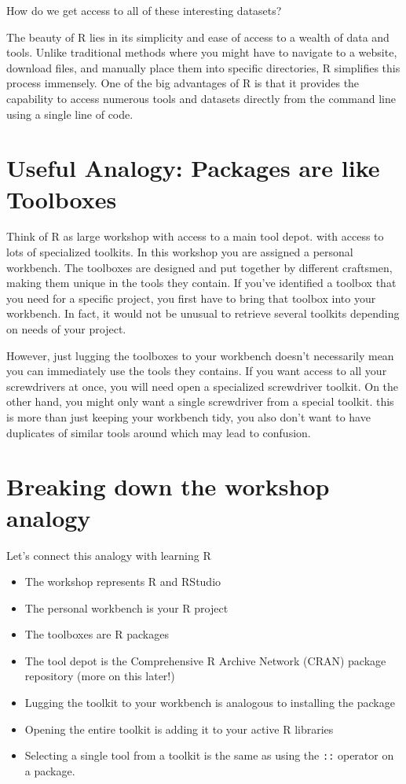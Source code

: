 \documentclass[
  letterpaper,
  DIV=11,
  numbers=noendperiod]{scrreprt}
\begin{document}
How do we get access to all of these interesting datasets?

The beauty of R lies in its simplicity and ease of access to a wealth of
data and tools. Unlike traditional methods where you might have to
navigate to a website, download files, and manually place them into
specific directories, R simplifies this process immensely. One of the
big advantages of R is that it provides the capability to access
numerous tools and datasets directly from the command line using a
single line of code.

\hypertarget{useful-analogy-packages-are-like-toolboxes}{%
\section{Useful Analogy: Packages are like
Toolboxes}\label{useful-analogy-packages-are-like-toolboxes}}

Think of R as large workshop with access to a main tool depot. with
access to lots of specialized toolkits. In this workshop you are
assigned a personal workbench. The toolboxes are designed and put
together by different craftsmen, making them unique in the tools they
contain. If you've identified a toolbox that you need for a specific
project, you first have to bring that toolbox into your workbench. In
fact, it would not be unusual to retrieve several toolkits depending on
needs of your project.

However, just lugging the toolboxes to your workbench doesn't
necessarily mean you can immediately use the tools they contains. If you
want access to all your screwdrivers at once, you will need open a
specialized screwdriver toolkit. On the other hand, you might only want
a single screwdriver from a special toolkit. this is more than just
keeping your workbench tidy, you also don't want to have duplicates of
similar tools around which may lead to confusion.

\hypertarget{breaking-down-the-workshop-analogy}{%
\section{Breaking down the workshop
analogy}\label{breaking-down-the-workshop-analogy}}

Let's connect this analogy with learning R

\begin{itemize}
\item
  The workshop represents R and RStudio
\item
  The personal workbench is your R project
\item
  The toolboxes are R packages
\item
  The tool depot is the Comprehensive R Archive Network (CRAN) package
  repository (more on this later!)
\item
  Lugging the toolkit to your workbench is analogous to installing the
  package
\item
  Opening the entire toolkit is adding it to your active R libraries
\item
  Selecting a single tool from a toolkit is the same as using the
  \texttt{::} operator on a package.
\end{itemize}
\end{document}
